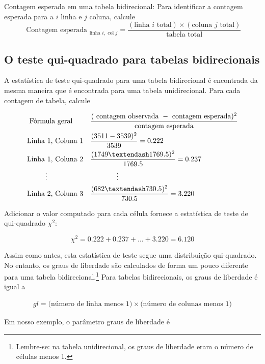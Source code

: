 \documentclass[
]{book}
\theoremstyle{definition}
\theoremstyle{definition}
\theoremstyle{definition}
\theoremstyle{definition}
\theoremstyle{remark}
\begin{document}
Contagem esperada em uma tabela bidirecional: Para identificar a contagem esperada para a \(i\) linha e \(j\) coluna, calcule
\[\text{ Contagem esperada }_{\text{linha }i,\text{ col }j} = \frac{(\text{linha $i$ total}) \times  (\text{coluna $j$ total})}{\text{tabela total}}\]

\hypertarget{chiSquareTestBidirectionalTables}{%
\subsection{O teste qui-quadrado para tabelas bidirecionais}\label{chiSquareTestBidirectionalTables}}

A estatística de teste qui-quadrado para uma tabela bidirecional é encontrada da mesma maneira que é encontrada para uma tabela unidirecional. Para cada contagem de tabela, calcule

\begin{align*}
&\text{ Fórmula geral }& &\frac{(\text{ contagem observada } - \text{ contagem esperada})^2}{\text{contagem esperada}} \\
&\text{Linha 1, Coluna 1}& &\frac{(3511 - 3539)^2}{3539} = 0.222 \\
&\text{Linha 1, Coluna 2}& &\frac{(1749 – 1769.5)^2}{1769.5} = 0.237 \\
& \hspace{9mm}\vdots & &\hspace{13mm}\vdots \\
&\text{Linha 2, Coluna 3}& &\frac{(682 – 730.5)^2}{730.5} = 3.220
\end{align*}

Adicionar o valor computado para cada célula fornece a estatística de teste de qui-quadrado \(\chi^2\):

\[\chi^2 = 0.222 + 0.237 + \dots + 3.220 = 6.120\]

Assim como antes, esta estatística de teste segue uma distribuição qui-quadrado. No entanto, os graus de liberdade são calculados de forma um pouco diferente para uma tabela bidirecional.\footnote{Lembre-se: na tabela unidirecional, os graus de liberdade eram o número de células menos 1.} Para tabelas bidirecionais, os graus de liberdade é igual a

\begin{align*}
gl = \text{(número de linha menos 1)}\times \text{(número de colunas menos 1)}
\end{align*}

Em nosso exemplo, o parâmetro graus de liberdade é
\end{document}
